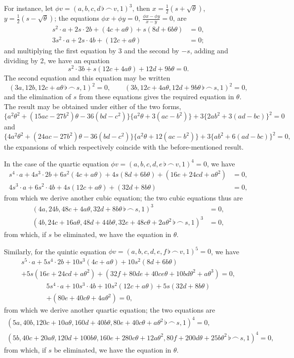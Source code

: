 \documentclass[11pt,a4paper]{book}
\begin{document}
For instance, let $\phi v=(a,b,c,d\,\flat\,\frown\, v,1)^3$, then $x=\tfrac{1}{2}(s+\sqrt{\theta})$, $y=\tfrac{1}{2}(s-\sqrt{\theta})$; the equations $\phi x+\phi y=0$, $\frac{\phi x-\phi y}{x-y}=0$, are
\begin{align*}
s^2\cdot a+2s\cdot 2b+(4c+a\theta)+s(8d+6b\theta) &= 0,\\
3s^2\cdot a+2s\cdot 4b+(12c+a\theta) &= 0;
\end{align*}
and multiplying the first equation by 3 and the second by $-s$, adding and dividing by 2, we have an equation
\[
s^2\cdot 3b+s(12c+4a\theta)+12d+9b\theta=0.
\]
The second equation and this equation may be written
\[
(3a,12b,12c+a\theta\,\flat\,\frown\, s,1)^2=0,\qquad (3b,12c+4a\theta,12d+9b\theta\,\flat\,\frown\, s,1)^2=0,
\]
and the elimination of $s$ from these equations gives the required equation in $\theta$. The result may be obtained under either of the two forms,
\[
\{a^2\theta^2+(15ac-27b^2)\theta-36(bd-c^2)\}\{a^2\theta+3(ac-b^2)\}+3\{2ab^2+3(ad-bc)\}^2=0
\]
and
\[
\{4a^2\theta^2+(24ac-27b^2)\theta-36(bd-c^2)\}\{a^2\theta+12(ac-b^2)\}+3\{ab^2+6(ad-bc)\}^2=0,
\]
the expansions of which respectively coincide with the before-mentioned result.

In the case of the quartic equation $\phi v=(a,b,c,d,e\,\flat\,\frown\, v,1)^4=0$, we have
\begin{align*}
s^4\cdot a+4s^3\cdot 2b+6s^2(4c+a\theta)+4s(8d+6b\theta)+(16e+24cd+a\theta^2) &= 0,\\
4s^3\cdot a+6s^2\cdot 4b+4s(12c+a\theta)+(32d+8b\theta) &= 0,
\end{align*}
from which we derive another cubic equation; the two cubic equations thus are
\begin{align*}
(4a,24b,48c+4a\theta,32d+8b\theta\,\flat\,\frown\, s,1)^3 &= 0,\\
(4b,24c+16a\theta,48d+44b\theta,32e+48c\theta+2a\theta^2\,\flat\,\frown\, s,1)^3 &= 0,
\end{align*}
from which, if $s$ be eliminated, we have the equation in $\theta$.

Similarly, for the quintic equation $\phi v=(a,b,c,d,e,f\,\flat\,\frown\, v,1)^5=0$, we have
\begin{multline*}
s^5\cdot a+5s^4\cdot 2b+10s^3(4c+a\theta)+10s^2(8d+6b\theta)\\
+5s(16e+24cd+a\theta^2)+(32f+80de+40ce\theta+10bd\theta^2+a\theta^3)=0,
\end{multline*}
\begin{multline*}
5s^4\cdot a+10s^3\cdot 4b+10s^2(12c+a\theta)+5s(32d+8b\theta)\\
+(80e+40c\theta+4a\theta^2)=0,
\end{multline*}
from which we derive another quartic equation; the two equations are
\begin{multline*}
(5a,40b,120c+10a\theta,160d+40b\theta,80e+40c\theta+a\theta^2\,\flat\,\frown\, s,1)^4=0,\\
(5b,40c+20a\theta,120d+100b\theta,160e+280c\theta+12a\theta^2,80f+200d\theta+25b\theta^2\,\flat\,\frown\, s,1)^4=0,
\end{multline*}
from which, if $s$ be eliminated, we have the equation in $\theta$.
\end{document}
